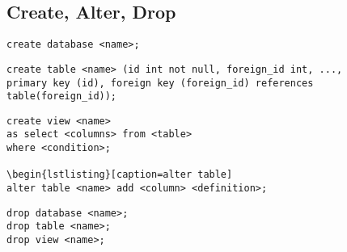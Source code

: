 \subsection{Create, Alter, Drop}

\begin{lstlisting}[caption=create database]
create database <name>;
\end{lstlisting}

\begin{lstlisting}[caption=create table]
create table <name> (id int not null, foreign_id int, ...,
primary key (id), foreign key (foreign_id) references table(foreign_id));
\end{lstlisting}

\begin{lstlisting}[caption=create view]
create view <name>
as select <columns> from <table>
where <condition>;

\begin{lstlisting}[caption=alter table]
alter table <name> add <column> <definition>;
\end{lstlisting}

\begin{lstlisting}[caption=drop]
drop database <name>;
drop table <name>;
drop view <name>;
\end{lstlisting}

